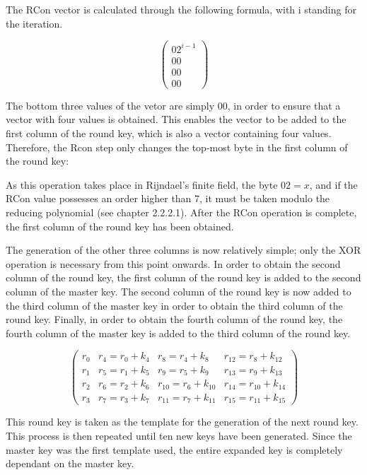 \documentclass[12pt]{report}
\theoremstyle{definition}
\theoremstyle{remark}
\begin{document}
The RCon vector is calculated through the following formula, with i standing for the iteration.

\[ \left( \begin{array}{c}
{02}^{i-1}\\
00 \\
00 \\
00\end{array} \right) \]

The bottom three values of the vetor are simply 00, in order to ensure that a vector with four values is obtained. This enables the vector to be added to the first column of the round key, which is also a vector containing four values. Therefore, the Rcon step only changes the top-most byte in the first column of the round key:

As this operation takes place in Rijndael's finite field, the byte ${02} = x$, and if the RCon value possesses an order higher than 7, it must be taken modulo the reducing polynomial (see chapter 2.2.2.1). After the RCon operation is complete, the first column of the round key has been obtained.

The generation of the other three columns is now relatively simple; only the XOR operation is necessary from this point onwards. In order to obtain the second column of the round key, the first column of the round key is added to the second column of the master key. The second column of the round key is now added to the third column of the master key in order to obtain the third column of the round key. Finally, in order to obtain the fourth column of the round key, the fourth column of the master key is added to the third column of the round key.

\[ \left( \begin{array}{cccc}
r_0 & r_4=r_0+k_4 & r_8=r_4+k_8 & r_{12}=r_8+k_{12} \\
r_1 & r_5=r_1+k_5 & r_9=r_5+k_9 & r_{13}=r_9+k_{13} \\
r_2 & r_6=r_2+k_6 & r_{10}=r_6+k_{10} & r_{14}=r_{10}+k_{14} \\
r_3 & r_7=r_3+k_7 & r_{11}=r_7+k_{11} & r_{15}=r_{11}+k_{15}\end{array} \right) \]

This round key is taken as the template for the generation of the next round key. This process is then repeated until ten new keys have been generated. Since the master key was the first template used, the entire expanded key is completely dependant on the master key.
\end{document}
